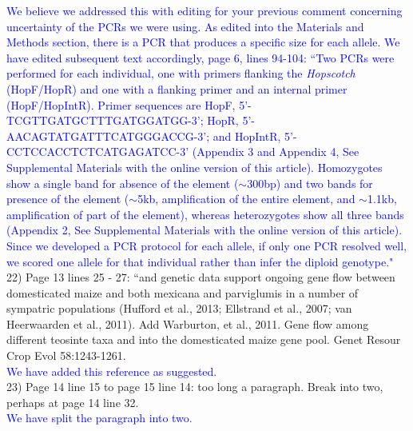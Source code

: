 \documentclass[11pt]{article}
\newcommand{\res}[1]{\noindent \textcolor{blue}{{#1}} \\}
\begin{document}
\res{We believe we addressed this with editing for your previous comment concerning uncertainty of the PCRs we were using. As edited into the Materials and Methods section, there is a PCR that produces a specific size for each allele. We have edited subsequent text accordingly, page 6, lines 94-104:  ``Two PCRs were performed for each individual, one with primers flanking the \emph{Hopscotch} (HopF/HopR) and one with a flanking primer and an internal primer (HopF/HopIntR). Primer sequences are HopF, {\small 5'-TCGTTGATGCTTTGATGGATGG-3'}; 
HopR, {\small 5'-AACAGTATGATTTCATGGGACCG-3'}; and HopIntR, {\small  5'-CCTCCACCTCTCATGAGATCC-3'} (Appendix 3 and Appendix 4, See Supplemental Materials with the online version of this article). Homozygotes show a single band for absence of the element ($\sim$300bp) and two bands for presence of the element ($\sim$5kb, amplification of the entire element, and $\sim$1.1kb, amplification of part of the element), whereas heterozygotes show all three bands (Appendix 2, See Supplemental Materials with the online version of this article). Since we developed a PCR protocol for each allele, if only one PCR resolved well, we scored one allele for that individual rather than infer the diploid genotype."}

22) Page 13 lines 25 - 27: ``and genetic data support ongoing gene ﬂow between domesticated maize and both mexicana and parviglumis in a number of sympatric populations (Huﬀord et al., 2013; Ellstrand et al., 2007; van Heerwaarden et al., 2011). Add Warburton, et al., 2011.  Gene flow among different teosinte taxa and into the domesticated maize gene pool.  Genet Resour Crop Evol 58:1243-1261.\\ 

\res{We have added this reference as suggested.}

23) Page 14 line 15 to page 15 line 14: too long a paragraph. Break into two, perhaps at page 14 line 32.\\ 

\res{We have split the paragraph into two.}


\end{document}
